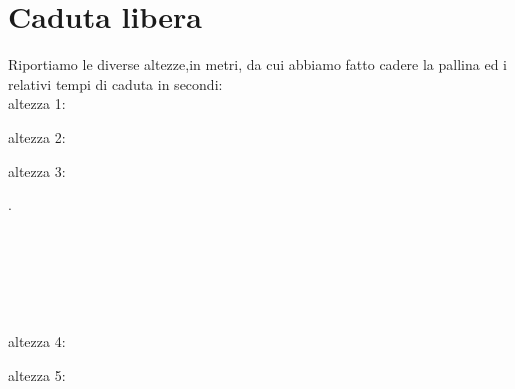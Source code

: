 \documentclass[a4paper]{article}
\theoremstyle{definition}
\begin{document}
\section*{Caduta libera}
	Riportiamo le diverse altezze,in metri, da cui abbiamo fatto cadere la pallina ed i relativi tempi di caduta in secondi:\\
	
	\noindent altezza 1:
	
\begin{table}[!htbp]
	\centering
	
\end{table}

\begin{table}[!htbp]
	\centering
	
\end{table}

	\noindent altezza 2:
	
\begin{table}[!htbp]
	\centering
	
\end{table}

\begin{table}[!htbp]
	\centering
	
\end{table}
	\noindent altezza 3:
		
\begin{table}[!htbp]
	\centering
	
\end{table}
\begin{table}[!htbp]
	\centering
	
\end{table}
.\\\\\\\\\\\\\\
	\noindent altezza 4:
		
\begin{table}[!htbp]
	\centering
	
\end{table}
\begin{table}[!htbp]
	\centering
	
\end{table}

	\noindent altezza 5:	
	
\end{document}
